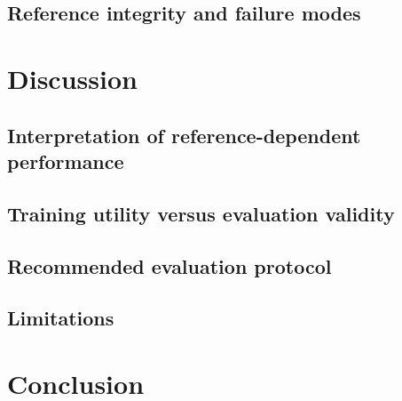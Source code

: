 \documentclass{elektr}
\begin{document}
\subsection*{Reference integrity and failure modes}

\section*{Discussion} \label{sec:discussion}

\subsection*{Interpretation of reference-dependent performance}

\subsection*{Training utility versus evaluation validity}

\subsection*{Recommended evaluation protocol}

\subsection*{Limitations}

\section*{Conclusion} \label{sec:conclusion}
\end{document}
